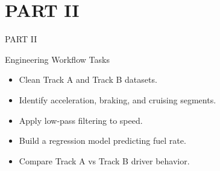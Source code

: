 \documentclass[aspectratio=169]{beamer}
\begin{document}
\section{PART II}
\begin{frame}[plain]
  \begin{center}
    \vspace{2cm}
    {\color{white}\Huge PART II}
  \end{center}
\end{frame}

\begin{frame}{Engineering Workflow Tasks}
  \begin{itemize}
    \item Clean Track A and Track B datasets.
    \item Identify acceleration, braking, and cruising segments.
    \item Apply low-pass filtering to speed.
    \item Build a regression model predicting fuel rate.
    \item Compare Track A vs Track B driver behavior.
  \end{itemize}
\end{frame}

\end{document}
